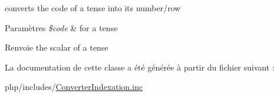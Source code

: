 converts the code of a tense into its number/row 


\begin{DoxyParams}{Paramètres}
{\em \$code} & for a tense \\
\hline
\end{DoxyParams}
\begin{DoxyReturn}{Renvoie}
the scalar of a tense 
\end{DoxyReturn}


La documentation de cette classe a été générée à partir du fichier suivant \+:\begin{DoxyCompactItemize}
\item 
php/includes/\hyperlink{_converter_indexation_8inc}{Converter\+Indexation.\+inc}\end{DoxyCompactItemize}
